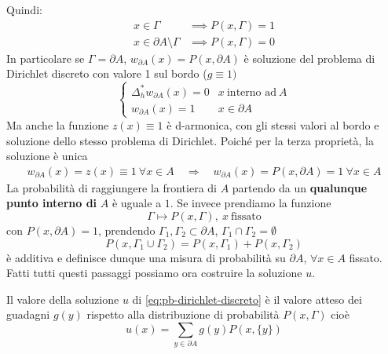\documentclass[10pt,a4paper,twoside,openright]{book}
\begin{document}
Quindi:
\begin{align*}
	x\in \Gamma &\implies P(x,\Gamma )=1\\
	x\in \partial A\setminus\Gamma &\implies P(x,\Gamma )=0
\end{align*}
In particolare se $\Gamma =\partial A$, $w_{\partial A}(x) =P(x,\partial A)$ è soluzione del problema di Dirichlet discreto con valore 1 sul bordo ($g\equiv 1)$
\begin{equation*}
	\begin{cases}
		\Delta ^{*}_{h} w_{\partial A}(x) =0 & x\ \text{interno ad} \ A \\
		w_{\partial A}(x) =1              & x\in \partial A          
	\end{cases}
\end{equation*}
Ma anche la funzione $z(x) \equiv 1$ è d-armonica, con gli stessi valori al bordo e soluzione dello stesso problema di Dirichlet. Poiché per la terza proprietà, la soluzione è unica 
\begin{gather*}
	w_{\partial A}(x) =z(x) \equiv 1\ \forall x\in A \quad \Rightarrow \quad w_{\partial A}(x) =P(x,\partial A) =1\ \forall x\in A
\end{gather*}
La probabilità di raggiungere la frontiera di $A$ partendo da un \textbf{qualunque punto interno di} $A$ è uguale a $1$. Se invece prendiamo la funzione
\begin{equation*}
	\Gamma \longmapsto P(x,\Gamma),\ x\ \text{fissato}
\end{equation*}
con $\displaystyle P(x,\partial A) =1$, prendendo $\displaystyle \Gamma _{1},\Gamma _{2} \subset \partial A$, $\displaystyle \Gamma _{1} \cap \Gamma _{2} =\emptyset $
\begin{equation*}
	P( x,\Gamma _{1} \cup \Gamma _{2}) =P(x,\Gamma _{1}) +P(x,\Gamma _{2})
\end{equation*}
è additiva e definisce dunque una misura di probabilità su $\displaystyle \partial A$, $\displaystyle \forall x\in A$ fissato. Fatti tutti questi passaggi possiamo ora costruire la soluzione $\displaystyle u$.
\begin{theorem}
	Il valore della soluzione $u$ di \eqref{eq:pb-dirichlet-discreto} è il valore atteso dei guadagni $g(y)$ rispetto alla distribuzione di probabilità $P(x,\Gamma)$ cioè
	\begin{equation*}
		u(x) =\sum _{y\in \partial A} g(y) P(x,\{y\})
	\end{equation*}
\end{theorem}
\end{document}
